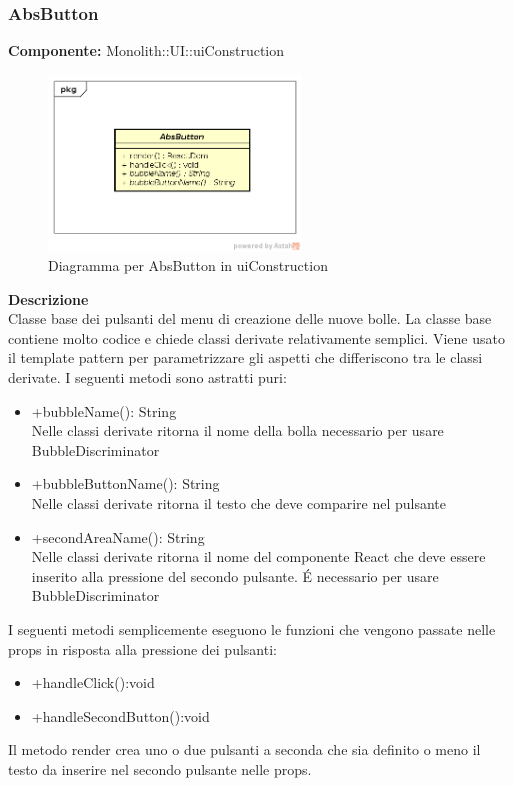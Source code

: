 \subsubsection{AbsButton}
\textbf{Componente:}  Monolith::UI::uiConstruction\\
   \FloatBarrier
   \begin{figure}[ht]
   \centering
   \includegraphics[width=0.6\textwidth]{img/single-AbsButton}
   \caption{{Diagramma per AbsButton in uiConstruction}}
\end{figure}
\FloatBarrier
\textbf{Descrizione}\\
Classe base dei pulsanti del menu di creazione delle nuove bolle. La classe base contiene molto codice e chiede classi derivate relativamente semplici. Viene usato il template pattern per parametrizzare gli aspetti che differiscono tra le classi derivate.
I seguenti metodi sono astratti puri:
\begin{itemize}
\item +bubbleName(): String \\
Nelle classi derivate ritorna il nome della bolla necessario per usare BubbleDiscriminator
\item +bubbleButtonName(): String \\
Nelle classi derivate ritorna il testo che deve comparire nel pulsante
\item +secondAreaName(): String \\
Nelle classi derivate ritorna il nome del componente React che deve essere inserito alla pressione del secondo pulsante. \'E necessario per usare BubbleDiscriminator
\end{itemize}
I seguenti metodi semplicemente eseguono le funzioni che vengono passate nelle props in risposta alla pressione dei pulsanti:
\begin{itemize}
\item +handleClick():void
\item +handleSecondButton():void
\end{itemize}
Il metodo render crea uno o due pulsanti a seconda che sia definito o meno il testo da inserire nel secondo pulsante nelle props. 


